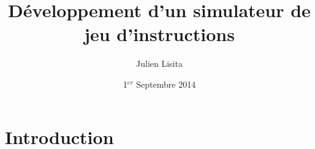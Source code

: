 \documentclass[a4paper,11pt,onecolumn]{mathese}
\begin{document}
\setlength{\parskip}{0.5em}%
\baselineskip 14pt


\title{\bf \huge Développement d'un simulateur de jeu d'instructions}
\author{Julien Lisita}
\date{1$^{er}$ Septembre 2014}

\begin{titlepage}
\begin{figure}
\begin{center}
\maketitle
\end{center}
\end{figure}
\end{titlepage}
%
%


\tableofcontents {}
\listoffigures

\mainmatter

\chapter{Introduction}
\label{introduction}


% 
%  



\end{document}
